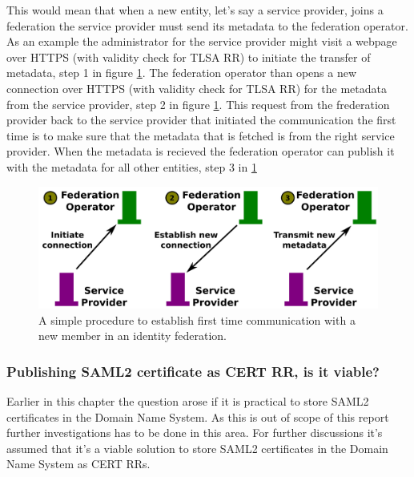 This would mean that when a new entity, let's say a service provider, joins a federation the service provider must send its metadata to the federation operator.
As an example the administrator for the service provider might visit a webpage over HTTPS (with validity check for TLSA RR) to initiate the transfer of metadata, step 1 in figure \ref{ch4:onlyUseTLS}.
The federation operator than opens a new connection over HTTPS (with validity check for TLSA RR) for the metadata from the service provider, step 2 in figure \ref{ch4:onlyUseTLS}.
This request from the frederation provider back to the service provider that initiated the communication the first time is to make sure that the metadata that is fetched is from the right service provider. 
When the metadata is recieved the federation operator can publish it with the metadata for all other entities, step 3 in \ref{ch4:onlyUseTLS}

\begin{figure}[ht]
\begin{center}
\includegraphics[scale=1]{Figures/onlyUseTLS.png}
\end{center}
\caption{A simple procedure to establish first time communication with a new member in an identity federation.
\label{ch4:onlyUseTLS}}
\end{figure}

%

\subsubsection{Publishing SAML2 certificate as CERT RR, is it viable?}
\label{subsec:saml2-certs-in-cert-rr}
Earlier in this chapter the question arose if it is practical to store SAML2 certificates in the Domain Name System.
As this is out of scope of this report further investigations has to be done in this area.
For further discussions it's assumed that it's a viable solution to store SAML2 certificates in the Domain Name System as CERT RRs.

